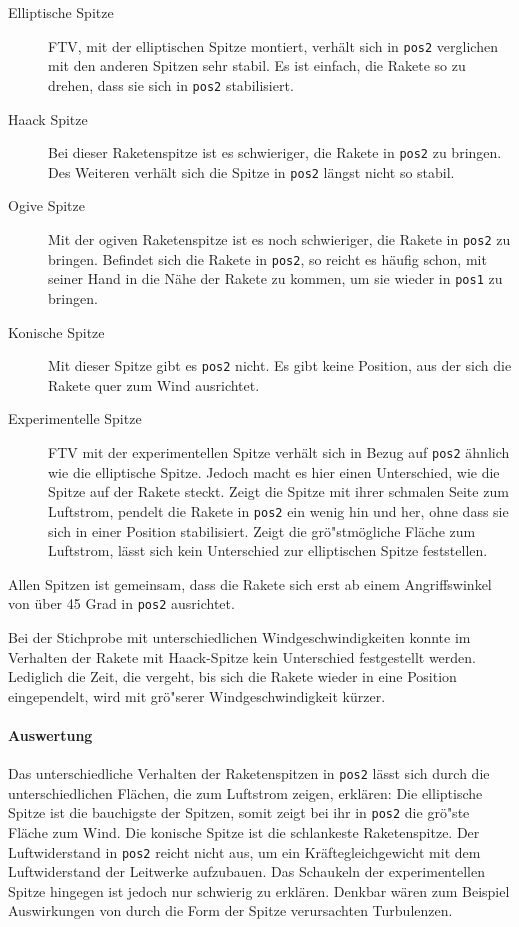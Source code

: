 \documentclass[10pt,a4paper]{article}
\begin{document}
\begin{description}
	\item[Elliptische Spitze] FTV, mit der elliptischen Spitze montiert, verhält sich in \texttt{pos2} verglichen mit den anderen Spitzen sehr stabil. Es ist einfach, die Rakete so zu drehen, dass sie sich in \texttt{pos2} stabilisiert.
	
	\item[Haack Spitze] Bei dieser Raketenspitze ist es schwieriger, die Rakete in \texttt{pos2} zu bringen. Des Weiteren verhält sich die Spitze in \texttt{pos2} längst nicht so stabil. 
	
	\item[Ogive Spitze] Mit der ogiven Raketenspitze ist es noch schwieriger, die Rakete in \texttt{pos2} zu bringen. Befindet sich die Rakete in \texttt{pos2}, so reicht es häufig schon, mit seiner Hand in die Nähe der Rakete zu kommen, um sie wieder in \texttt{pos1} zu bringen.
	
	\item[Konische Spitze] Mit dieser Spitze gibt es \texttt{pos2} nicht. Es gibt keine Position, aus der sich die Rakete quer zum Wind ausrichtet.
	
	\item[Experimentelle Spitze] FTV mit der experimentellen Spitze verhält sich in Bezug auf \texttt{pos2} ähnlich wie die elliptische Spitze. Jedoch macht es hier einen Unterschied, wie die Spitze auf der Rakete steckt. Zeigt die Spitze mit ihrer schmalen Seite zum Luftstrom, pendelt die Rakete in \texttt{pos2} ein wenig hin und her, ohne dass sie sich in einer Position stabilisiert.
	Zeigt die grö"stmögliche Fläche zum Luftstrom, lässt sich kein Unterschied zur elliptischen Spitze feststellen.	
\end{description}

\noindent
Allen Spitzen ist gemeinsam, dass die Rakete sich erst ab einem Angriffswinkel von über 45 Grad in \texttt{pos2} ausrichtet.

Bei der Stichprobe mit unterschiedlichen Windgeschwindigkeiten konnte im Verhalten der Rakete mit Haack-Spitze kein Unterschied festgestellt werden. Lediglich die Zeit, die vergeht, bis sich die Rakete wieder in eine Position eingependelt, wird mit grö"serer Windgeschwindigkeit kürzer.

\paragraph{Auswertung}
Das unterschiedliche Verhalten der Raketenspitzen in \texttt{pos2} lässt sich durch die unterschiedlichen Flächen, die zum Luftstrom zeigen, erklären: Die elliptische Spitze ist die bauchigste der Spitzen, somit zeigt bei ihr in \texttt{pos2} die grö"ste Fläche zum Wind. 
Die konische Spitze ist die schlankeste Raketenspitze. Der Luftwiderstand in \texttt{pos2} reicht nicht aus, um ein Kräftegleichgewicht mit dem Luftwiderstand der Leitwerke aufzubauen.
Das Schaukeln der experimentellen Spitze hingegen ist jedoch nur schwierig zu erklären. Denkbar wären zum Beispiel Auswirkungen von durch die Form der Spitze verursachten Turbulenzen.
\end{document}
